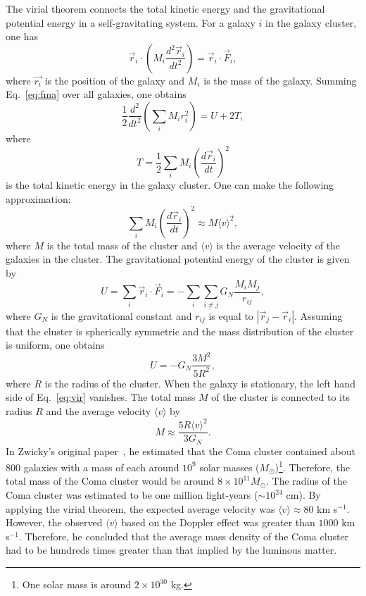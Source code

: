 \documentclass[doublespace,nopageskip]{VTthesis}
\begin{document}
{
The virial theorem connects the total kinetic energy and the gravitational potential energy in a self-gravitating system. For a galaxy $i$ in the galaxy cluster, one has
\begin{equation}
    \label{eq:fma}
    \vec{r}_i\cdot\left(M_i\frac{d^2\vec{r}_i}{dt^2}\right)=\vec{r}_i\cdot\vec{F}_i,
\end{equation}
where $\vec{r_i}$ is the position of the galaxy and $M_i$ is the mass of the galaxy. Summing Eq.~\ref{eq:fma} over all galaxies, one obtains
\begin{equation}
    \label{eq:vir}
    \frac{1}{2}\frac{d^2}{dt^2}\left(\sum_i M_i r_i^2\right)= U + 2T,
\end{equation}
where
\begin{equation}
    T = \frac{1}{2}\sum_i M_i \left(\frac{d\vec{r}_i}{dt}\right)^2
\end{equation}
is the total kinetic energy in the galaxy cluster. One can make the following approximation:
\begin{equation}
    \sum_i M_i \left(\frac{d\vec{r}_i}{dt}\right)^2 \approx M\langle v\rangle^2,
\end{equation}
where $M$ is the total mass of the cluster and $\langle v\rangle$ is the average velocity of the galaxies in the cluster. The gravitational potential energy of the cluster is given by
\begin{equation}
    U = \sum_i\vec{r}_i\cdot\vec{F}_i = -\sum_i\sum_{i\neq j}G_N\frac{M_iM_j}{r_{ij}},
\end{equation}
where $G_N$ is the gravitational constant and $r_{ij}$ is equal to $|\vec{r}_j - \vec{r}_i|$. Assuming that the cluster is spherically symmetric and the mass distribution of the cluster is uniform, one obtains
\begin{equation}
    U = -G_N\frac{3M^2}{5R^2},
\end{equation}
where $R$ is the radius of the cluster.
When the galaxy is stationary, the left hand side of Eq.~\ref{eq:vir} vanishes. The total mass $M$ of the cluster is connected to its radius $R$ and the average velocity $\langle v\rangle$ by
\begin{equation}
    M \approx \frac{5R\langle v\rangle^2}{3G_N}.
\end{equation}
In Zwicky's original paper~\cite{1933AcHPh...6..110Z}, he estimated that the Coma cluster contained about 800 galaxies with a mass of each around $10^9$ solar masses ($M_\odot$)\footnote{One solar mass is around $2\times 10^{30}$ kg.}. Therefore, the total mass of the Coma cluster would be around $8\times 10^{11} M_\odot$. The radius of the Coma cluster was estimated to be one million light-years ($\sim 10^{24}$ cm). By applying the virial theorem, the expected average velocity was $\langle v\rangle \approx 80$ km s$^{-1}$. However, the observed $\langle v\rangle$ based on the Doppler effect was greater than $1000$ km s$^{-1}$. Therefore, he concluded that the average mass density of the Coma cluster had to be hundreds times greater than that implied by the luminous matter.
}
\end{document}
